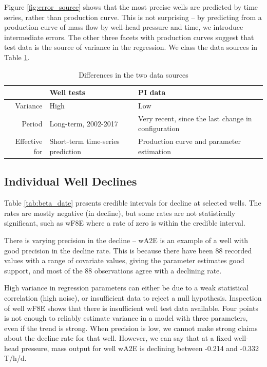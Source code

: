 \documentclass[a4paper, 12pt]{article}
\begin{document}
Figure \ref{fig:error_source} shows that the most precise wells are predicted by time series, rather than production curve. This is not surprising -- by predicting from a production curve of mass flow by well-head pressure and time, we introduce intermediate errors. The other three facets with production curves suggest that test data is the source of variance in the regression. We class the data sources in Table \ref{tab:data_sources}.

\begin{table}
\centering
\begin{tabularx}{0.85\linewidth}{rXX}
\hline
 & Well tests & PI data \\ 
  \hline
Variance & High & Low  \\
Period & Long-term, 2002-2017 & Very recent, since the last change in configuration \\
Effective for & Short-term time-series prediction & Production curve and parameter estimation \\
   \hline
\end{tabularx}
\caption{Differences in the two data sources}
\label{tab:data_sources}
\end{table}

\subsection{Individual Well Declines}



Table \ref{tab:beta_date} presents credible intervals for decline at selected wells. The rates are mostly negative (in decline), but some rates are not statistically significant, such as wF8E where a rate of zero is within the credible interval.

There is varying precision in the decline -- wA2E is an example of a well with good precision in the decline rate. This is because there have been 88 recorded values with a range of covariate values, giving the parameter estimates good support, and most of the 88 observations agree with a declining rate.

High variance in regression parameters can either be due to a weak statistical correlation (high noise), or insufficient data to reject a null hypothesis. Inspection of well wF8E shows that there is insufficient well test data available. Four points is not enough to reliably estimate variance in a model with three parameters, even if the trend is strong. When precision is low, we cannot make strong claims about the decline rate for that well. However, we can say that at a fixed well-head pressure, mass output for well wA2E is declining between -0.214 and -0.332 T/h/d.
\end{document}
